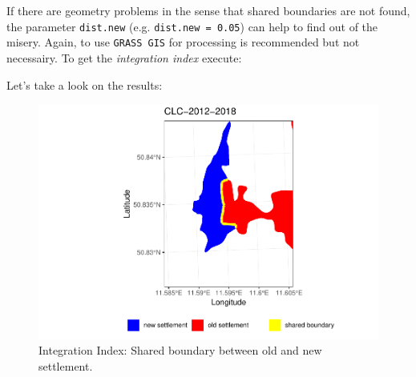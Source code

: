 \documentclass[]{article}
\newenvironment{Shaded}{\begin{snugshade}}{\end{snugshade}}
\newcommand{\KeywordTok}[1]{\textcolor[rgb]{0.13,0.29,0.53}{\textbf{#1}}}
\newcommand{\DataTypeTok}[1]{\textcolor[rgb]{0.13,0.29,0.53}{#1}}
\newcommand{\DecValTok}[1]{\textcolor[rgb]{0.00,0.00,0.81}{#1}}
\newcommand{\StringTok}[1]{\textcolor[rgb]{0.31,0.60,0.02}{#1}}
\newcommand{\CommentTok}[1]{\textcolor[rgb]{0.56,0.35,0.01}{\textit{#1}}}
\newcommand{\OtherTok}[1]{\textcolor[rgb]{0.56,0.35,0.01}{#1}}
\newcommand{\OperatorTok}[1]{\textcolor[rgb]{0.81,0.36,0.00}{\textbf{#1}}}
\newcommand{\NormalTok}[1]{#1}
\begin{document}
If there are geometry problems in the sense that shared boundaries are
not found, the parameter \texttt{dist.new} (e.g.
\texttt{dist.new\ =\ 0.05}) can help to find out of the misery. Again,
to use \texttt{GRASS\ GIS} for processing is recommended but not
necessairy. To get the \emph{integration index} execute:

\begin{Shaded}
\end{Shaded}

Let's take a look on the results:

\begin{figure}[!h]

{\centering \includegraphics{vignette_R_files/figure-latex/unnamed-chunk-11-1} 

}

\caption{Integration Index: Shared boundary between old and new settlement.}\label{fig:unnamed-chunk-11}
\end{figure}
\end{document}
